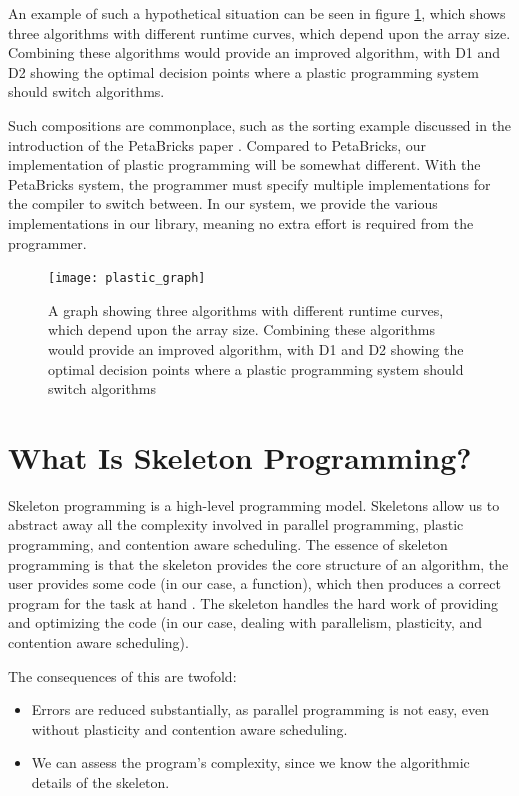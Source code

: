 An example of such a hypothetical situation can be seen in figure \ref{fig:plastic_graph}, which shows three algorithms with different runtime curves, which depend upon the array size. Combining these algorithms would provide an improved algorithm, with D1 and D2 showing the optimal decision points where a plastic programming system should switch algorithms.

Such compositions are commonplace, such as the sorting example discussed in the introduction of the PetaBricks paper \cite{petabricks}. Compared to PetaBricks, our implementation of plastic programming will be somewhat different. With the PetaBricks system, the programmer must specify multiple implementations for the compiler to switch between. In our system, we provide the various implementations in our library, meaning no extra effort is required from the programmer.



\begin{figure}
	\centering
	\texttt{[image: plastic\_graph]}
	\caption{A graph showing three algorithms with different runtime curves, which depend upon the array size. Combining these algorithms would provide an improved algorithm, with D1 and D2 showing the optimal decision points where a plastic programming system should switch algorithms}
	\label{fig:plastic_graph}
\end{figure}



\section{What Is Skeleton Programming?}
\label{section:background_what_is_skeleton_programming}

Skeleton programming is a high-level programming model. Skeletons allow us to abstract away all the complexity involved in parallel programming, plastic programming, and contention aware scheduling. The essence of skeleton programming is that the skeleton provides the core structure of an algorithm, the user provides some code (in our case, a function), which then produces a correct program for the task at hand \cite{patterns_and_frameworks}. The skeleton handles the hard work of providing and optimizing the code (in our case, dealing with parallelism, plasticity, and contention aware scheduling). 

The consequences of this are twofold:

\begin{itemize}
	\item Errors are reduced substantially, as parallel programming is not easy, even without plasticity and contention aware scheduling.
	\item We can assess the program's complexity, since we know the algorithmic details of the skeleton.
\end{itemize}

